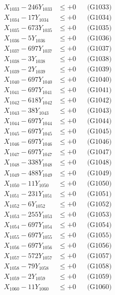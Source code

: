 \documentclass[a4paper,10pt]{article}
\begin{document}
{\begin{align}
X_{1033} - 246Y_{1033} &\leq +0 && \text{(G1033)} \\
X_{1034} - 17Y_{1034} &\leq +0 && \text{(G1034)} \\
X_{1035} - 673Y_{1035} &\leq +0 && \text{(G1035)} \\
X_{1036} - 5Y_{1036} &\leq +0 && \text{(G1036)} \\
X_{1037} - 697Y_{1037} &\leq +0 && \text{(G1037)} \\
X_{1038} - 3Y_{1038} &\leq +0 && \text{(G1038)} \\
X_{1039} - 2Y_{1039} &\leq +0 && \text{(G1039)} \\
X_{1040} - 697Y_{1040} &\leq +0 && \text{(G1040)} \\
\allowbreak
X_{1041} - 697Y_{1041} &\leq +0 && \text{(G1041)} \\
X_{1042} - 618Y_{1042} &\leq +0 && \text{(G1042)} \\
X_{1043} - 38Y_{1043} &\leq +0 && \text{(G1043)} \\
X_{1044} - 697Y_{1044} &\leq +0 && \text{(G1044)} \\
X_{1045} - 697Y_{1045} &\leq +0 && \text{(G1045)} \\
X_{1046} - 697Y_{1046} &\leq +0 && \text{(G1046)} \\
X_{1047} - 697Y_{1047} &\leq +0 && \text{(G1047)} \\
X_{1048} - 338Y_{1048} &\leq +0 && \text{(G1048)} \\
X_{1049} - 488Y_{1049} &\leq +0 && \text{(G1049)} \\
X_{1050} - 11Y_{1050} &\leq +0 && \text{(G1050)} \\
\allowbreak
X_{1051} - 231Y_{1051} &\leq +0 && \text{(G1051)} \\
X_{1052} - 6Y_{1052} &\leq +0 && \text{(G1052)} \\
X_{1053} - 255Y_{1053} &\leq +0 && \text{(G1053)} \\
X_{1054} - 697Y_{1054} &\leq +0 && \text{(G1054)} \\
X_{1055} - 697Y_{1055} &\leq +0 && \text{(G1055)} \\
X_{1056} - 697Y_{1056} &\leq +0 && \text{(G1056)} \\
X_{1057} - 572Y_{1057} &\leq +0 && \text{(G1057)} \\
X_{1058} - 79Y_{1058} &\leq +0 && \text{(G1058)} \\
X_{1059} - 2Y_{1059} &\leq +0 && \text{(G1059)} \\
X_{1060} - 11Y_{1060} &\leq +0 && \text{(G1060)} \\

\end{align}}
\end{document}
